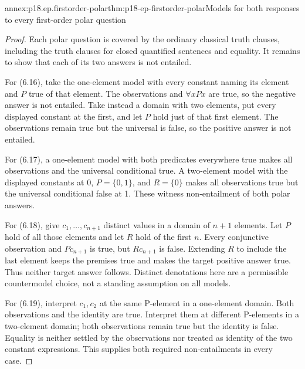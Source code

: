 \begin{annexitem}{annex:p18.ep.firstorder-polar}{thm:p18-ep-firstorder-polar}{Models for both responses to every first-order polar question}
\begin{proof}
Each polar question is covered by the ordinary classical truth clauses,
including the truth clauses for closed quantified sentences and equality.
It remains to show that each of its two answers is not entailed.

For (6.16), take the one-element model with every constant naming its
element and \(P\) true of that element. The observations and
\(\forall xPx\) are true, so the negative answer is not entailed.
Take instead a domain with two elements, put every displayed constant at
the first, and let \(P\) hold just of that first element. The observations
remain true but the universal is false, so the positive answer is not entailed.

For (6.17), a one-element model with both predicates everywhere true makes
all observations and the universal conditional true. A two-element model
with the displayed constants at 0, \(P=\{0,1\}\), and \(R=\{0\}\)
makes all observations true but the universal conditional false at 1.
These witness non-entailment of both polar answers.

For (6.18), give \(c_1,\ldots,c_{n+1}\) distinct values in a domain
of \(n+1\) elements. Let \(P\) hold of all those elements and let
\(R\) hold of the first \(n\). Every conjunctive observation and
\(Pc_{n+1}\) is true, but \(Rc_{n+1}\) is false. Extending \(R\)
to include the last element keeps the premises true and makes the target
positive answer true. Thus neither target answer follows. Distinct
denotations here are a permissible countermodel choice, not a standing
assumption on all models.

For (6.19), interpret \(c_1,c_2\) at the same P-element in a one-element
domain. Both observations and the identity are true. Interpret them at
different P-elements in a two-element domain; both observations remain
true but the identity is false. Equality is neither settled by the
observations nor treated as identity of the two constant expressions.
This supplies both required non-entailments in every case.
\end{proof}
\end{annexitem}

